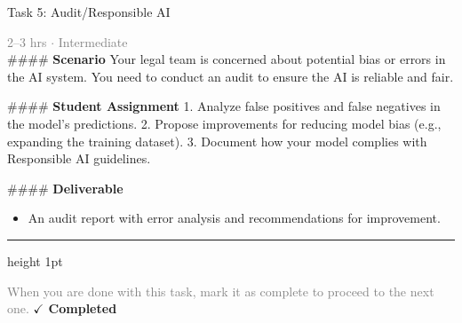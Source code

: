 \documentclass[10pt,a4paper]{article}
\begin{document}
\begin{taskbox}{Task 5: Audit/Responsible AI}

    {\small \textcolor{gray}{2--3 hrs $\cdot$ Intermediate}}\\[12pt]

    \#\#\#\# \textbf{Scenario}  
Your legal team is concerned about potential bias or errors in the AI system. You need to conduct an audit to ensure the AI is reliable and fair.  

\#\#\#\# \textbf{Student Assignment}  
1. Analyze false positives and false negatives in the model's predictions.  
2. Propose improvements for reducing model bias (e.g., expanding the training dataset).  
3. Document how your model complies with Responsible AI guidelines.  

\#\#\#\# \textbf{Deliverable}  
\begin{itemize}
    \item An audit report with error analysis and recommendations for improvement.\par
\end{itemize}

    \vspace{16pt}

    \textcolor{cardBorder}{\hrule height 1pt}\vspace{8pt}

    \small \textcolor{gray}{When you are done with this task, mark it as complete to proceed to the next one.} \hfill \textbf{\textcolor{brandDark}{$\checkmark$ Completed}}

\end{taskbox}
\end{document}
